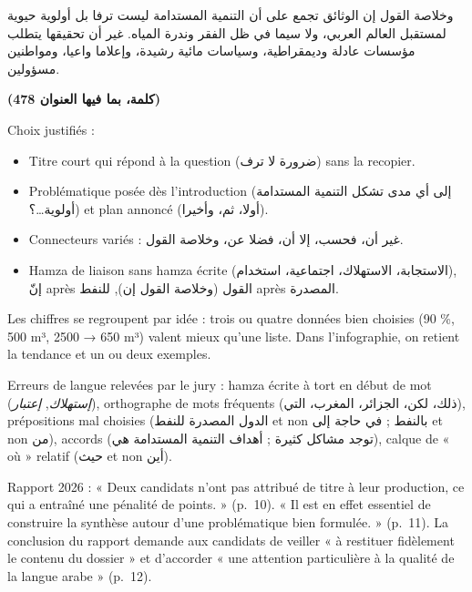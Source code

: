 \documentclass[11pt,a4paper]{article}
\providecommand{\tightlist}{\setlength{\itemsep}{0pt}\setlength{\parskip}{0pt}}
\begin{document}
وخلاصة القول إن الوثائق تجمع على أن التنمية المستدامة ليست ترفا بل أولوية حيوية لمستقبل العالم العربي، ولا سيما في ظل الفقر وندرة المياه. غير أن تحقيقها يتطلب مؤسسات عادلة وديمقراطية، وسياسات مائية رشيدة، وإعلاما واعيا، ومواطنين مسؤولين.

\textbf{(478 كلمة، بما فيها العنوان)}

Choix justifiés :

\begin{itemize}
\tightlist
\item
  Titre court qui répond à la question (ضرورة لا ترف) sans la recopier.
\item
  Problématique posée dès l'introduction (إلى أي مدى تشكل التنمية المستدامة أولوية\ldots؟) et plan annoncé (أولا، ثم، وأخيرا).
\item
  Connecteurs variés : غير أن، فحسب، إلا أن، فضلا عن، وخلاصة القول.
\item
  Hamza de liaison sans hamza écrite (الاستجابة، الاستهلاك، اجتماعية، استخدام), إنّ après القول (وخلاصة القول إن), للنفط après المصدرة.
\end{itemize}

\begin{methode}

Les chiffres se regroupent par idée : trois ou quatre données bien choisies (90 \%, 500 m³, 2500 → 650 m³) valent mieux qu'une liste. Dans l'infographie, on retient la tendance et un ou deux exemples.

\end{methode}

\begin{piege}

Erreurs de langue relevées par le jury : hamza écrite à tort en début de mot (\emph{إستهلاك}, \emph{إعتبار}), orthographe de mots fréquents (ذلك، لكن، الجزائر، المغرب، التي), prépositions mal choisies (الدول المصدرة للنفط et non بالنفط ; في حاجة إلى et non من), accords (توجد مشاكل كثيرة ; أهداف التنمية المستدامة هي), calque de « où » relatif (حيث et non أين).

\end{piege}

\begin{jury}

Rapport 2026 : « Deux candidats n'ont pas attribué de titre à leur production, ce qui a entraîné une pénalité de points. » (p.~10). « Il est en effet essentiel de construire la synthèse autour d'une problématique bien formulée. » (p.~11). La conclusion du rapport demande aux candidats de veiller « à restituer fidèlement le contenu du dossier » et d'accorder « une attention particulière à la qualité de la langue arabe » (p.~12).

\end{jury}
\end{document}
